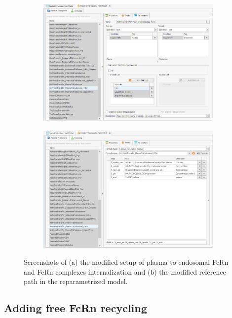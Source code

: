 \documentclass[fleqn,10pt]{physiome}
\begin{document}
\begin{figure}[htb]\centering
    \begin{subfigure}{0.49\textwidth}
        \includegraphics[width=\textwidth]{Picture2.png}
        \caption{}
        \label{pic:1a}
    \end{subfigure}
    \hfill
    \begin{subfigure}{0.49\textwidth}
        \includegraphics[width=\textwidth]{Picture3.png}
        \caption{}
        \label{pic:1b}
    \end{subfigure}
    \caption{Screenshots of (a) the modified setup of plasma to endosomal FcRn and FcRn complexes internalization and (b) the modified reference path in the reparametrized model.}
    \label{pic1}
\end{figure}


\subsection{Adding free FcRn recycling}
\end{document}
